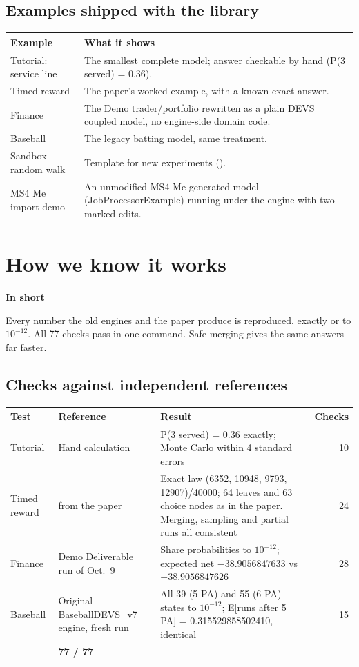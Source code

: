 \documentclass[11pt]{article}
\newcommand{\shadedbox}[3]{\par\smallskip\noindent\colorbox{#1}{\parbox{\dimexpr\linewidth-2\fboxsep}{\textbf{#2}\par #3}}\par\smallskip}
\newcommand{\takeaway}[1]{\shadedbox{okbg}{In short}{#1}}
\begin{document}
\subsection{Examples shipped with the library}
\begin{tabularx}{\linewidth}{@{}lY@{}}
\toprule
\textbf{Example} & \textbf{What it shows}\\
\midrule
Tutorial: service line & The smallest complete model; answer checkable by hand (P(3 served) = 0.36).\\
Timed reward & The paper's worked example, with a known exact answer.\\
Finance & The Demo trader/portfolio rewritten as a plain DEVS coupled model, no engine-side domain code.\\
Baseball & The legacy batting model, same treatment.\\
Sandbox random walk & Template for new experiments ().\\
MS4 Me import demo & An unmodified MS4 Me-generated model (JobProcessorExample) running under the engine with two
  marked edits.\\
\bottomrule
\end{tabularx}

\section{How we know it works}\label{sec:verify}

\takeaway{Every number the old engines and the paper produce is reproduced, exactly or to $10^{-12}$. All 77 checks
pass in one command. Safe merging gives the same answers far faster.}

\subsection{Checks against independent references}
\begin{tabularx}{\linewidth}{@{}>{\raggedright}p{2.6cm}>{\raggedright}p{4.2cm}Yr@{}}
\toprule
\textbf{Test} & \textbf{Reference} & \textbf{Result} & \textbf{Checks}\\
\midrule
Tutorial & Hand calculation & P(3 served) = 0.36 exactly; Monte Carlo within 4 standard errors & 10\\
Timed reward &  from the paper & Exact law (6352, 10948, 9793, 12907)/40000; 64 leaves
  and 63 choice nodes as in the paper. Merging, sampling and partial runs all consistent & 24\\
Finance & Demo Deliverable run of Oct.~9 & Share probabilities to $10^{-12}$; expected net $-38.9056847633$ vs
  $-38.9056847626$ & 28\\
Baseball & Original BaseballDEVS\_v7 engine, fresh run & All 39 (5 PA) and 55 (6 PA) states to $10^{-12}$;
  E[runs after 5 PA] = 0.315529858502410, identical & 15\\
\midrule
{} & \textbf{77 / 77}\\
\bottomrule
\end{tabularx}
\end{document}
